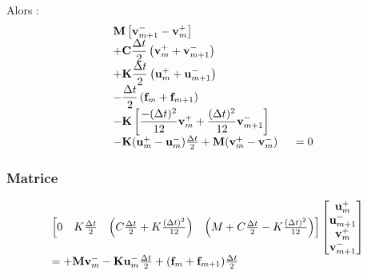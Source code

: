 \documentclass[12pt,a4paper]{report}
\begin{document}
Alors :
\begin{equation}
\begin{array}{r l}
	&\displaystyle
	 \mathbf{M} 
	    	\left[ \mathbf{v}_{m+1}^- 
	    		- \mathbf{v}_m^+ \right] 
	\\ 
	  &\displaystyle
	  +\mathbf{C} \frac{\Delta t}{2}
		\left(
			\mathbf{v}_m^+ + 
			\mathbf{v}_{m+1}^- 
		\right) 
	\\
	  &\displaystyle
	 +\mathbf{K} \frac{\Delta t}{2}
		\left(
			\mathbf{u}_m^+ + 
			\mathbf{u}_{m+1}^- 
		\right) 
	\\
	  &\displaystyle
	   -\frac{\Delta t}{2}
		\left(
			\mathbf{f}_m + 
			\mathbf{f}_{m+1}
		\right) 
	\\
	  &\displaystyle	    
	    -\mathbf{K}
		\left[
			\frac{-(\Delta t)^2}{12} \mathbf{v}_m^+ 
			+\frac{(\Delta t)^2}{12} \mathbf{v}_{m+1}^- 
		\right]
	\\
	  &- \mathbf{K} (\mathbf{u}_m^+ - \mathbf{u}_m^-) \frac{\Delta t}{2}
	   + \mathbf{M} (\mathbf{v}_m^+ - \mathbf{v}_m^-) 
	~~~~=0	
\end{array}
\end{equation}

\subsubsection{Matrice}

\begin{equation}
\begin{array}{l l}
		\begin{bmatrix}	   
		   0
		   &K \frac{\Delta t}{2}
		   & \left( C \frac{\Delta t}{2}
		    		+ K \frac{(\Delta t)^2}{12}
		     \right)
		   & \left(	M
		    		+ C \frac{\Delta t}{2}
		    		- K \frac{(\Delta t)^2}{12} 
		     \right)\\ 
		\end{bmatrix}
		\begin{bmatrix}
		   \mathbf{u}_m^+  		\\
		   \mathbf{u}_{m+1}^-  	\\
		   \mathbf{v}_m^+  		\\
		   \mathbf{v}_{m+1}^-  	\\
		\end{bmatrix}
	\\
		= + \mathbf{M} \mathbf{v}_m^-
		  - \mathbf{K} \mathbf{u}_m^- \frac{\Delta t}{2}
		  + (\mathbf{f}_m + \mathbf{f}_{m+1})  \frac{\Delta t}{2}
	
\end{array}
\end{equation}
\end{document}
